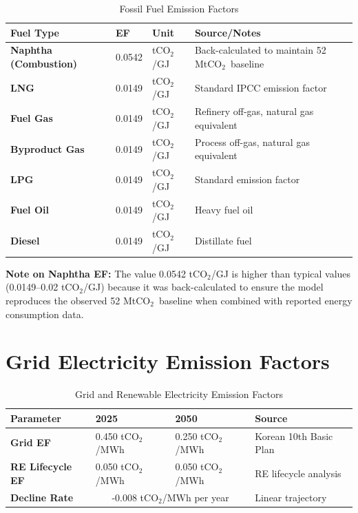 \documentclass[11pt,a4paper]{report}
\newcommand{\mtco}{MtCO$_2$}
\newcommand{\tco}{tCO$_2$}
\begin{document}
\begin{table}[H]
\centering
\caption{Fossil Fuel Emission Factors}
\begin{tabular}{p{5cm}p{3cm}p{2cm}p{5cm}}
\toprule
\textbf{Fuel Type} & \textbf{EF} & \textbf{Unit} & \textbf{Source/Notes} \\
\midrule
\textbf{Naphtha (Combustion)} & 0.0542 & \tco/GJ & Back-calculated to maintain 52 \mtco\ baseline \\
\textbf{LNG} & 0.0149 & \tco/GJ & Standard IPCC emission factor \\
\textbf{Fuel Gas} & 0.0149 & \tco/GJ & Refinery off-gas, natural gas equivalent \\
\textbf{Byproduct Gas} & 0.0149 & \tco/GJ & Process off-gas, natural gas equivalent \\
\textbf{LPG} & 0.0149 & \tco/GJ & Standard emission factor \\
\textbf{Fuel Oil} & 0.0149 & \tco/GJ & Heavy fuel oil \\
\textbf{Diesel} & 0.0149 & \tco/GJ & Distillate fuel \\
\bottomrule
\end{tabular}
\label{tab:fossil-ef}
\end{table}

\textbf{Note on Naphtha EF:} The value 0.0542 \tco/GJ is higher than typical values (0.0149--0.02 \tco/GJ) because it was back-calculated to ensure the model reproduces the observed 52 \mtco\ baseline when combined with reported energy consumption data.

\section{Grid Electricity Emission Factors}

\begin{table}[H]
\centering
\caption{Grid and Renewable Electricity Emission Factors}
\begin{tabular}{p{5cm}p{3cm}p{3cm}p{4cm}}
\toprule
\textbf{Parameter} & \textbf{2025} & \textbf{2050} & \textbf{Source} \\
\midrule
\textbf{Grid EF} & 0.450 \tco/MWh & 0.250 \tco/MWh & Korean 10th Basic Plan \\
\textbf{RE Lifecycle EF} & 0.050 \tco/MWh & 0.050 \tco/MWh & RE lifecycle analysis \\
\textbf{Decline Rate} & \multicolumn{2}{c}{-0.008 \tco/MWh per year} & Linear trajectory \\
\bottomrule
\end{tabular}
\label{tab:grid-ef}
\end{table}
\end{document}
